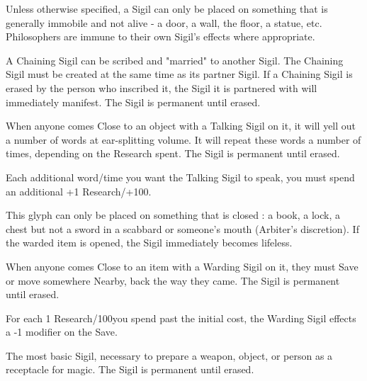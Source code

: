 Unless otherwise specified, a Sigil can only be placed on something that is generally immobile and not alive - a door, a wall, the floor, a statue, etc.  Philosophers are immune to their own Sigil's effects where appropriate. 

\newpage 

\large{}\normalsize




A Chaining Sigil can be scribed and "married" to another Sigil.  The Chaining Sigil must be created at the same time as its partner Sigil.  If a Chaining Sigil is erased by the person who inscribed it, the Sigil it is partnered with will immediately manifest. The Sigil is permanent until erased.


When anyone comes Close to an object with a Talking Sigil on it, it will yell out a number of words at ear-splitting volume.  It will repeat these words a number of times, depending on the Research spent.  The Sigil is permanent until erased.

Each additional word/time you want the Talking Sigil to speak, you must spend an additional +1 Research/+100\FE.



This glyph can only be placed on something that is closed : a book, a lock, a chest but not a sword in a scabbard or someone's mouth (Arbiter's discretion).  If the warded item is opened, the Sigil immediately becomes lifeless.

When anyone comes Close to an item with a Warding Sigil on it, they must Save or move somewhere Nearby, back the way they came.  The Sigil is permanent until erased.

For each 1 Research/100\FE you spend past the initial cost, the Warding Sigil effects a -1 modifier on the Save.



The most basic Sigil, necessary to prepare a weapon, object, or person as a receptacle for magic.  The Sigil is permanent until erased.


\large{}\normalsize




